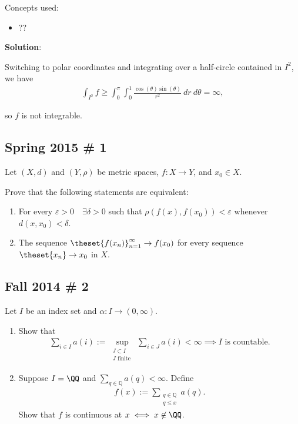 
\begin{solution}

Concepts used:

\begin{itemize}
\tightlist
\item
  ??
\end{itemize}

\textbf{Solution}:

Switching to polar coordinates and integrating over a half-circle
contained in \(I^2\), we have
\begin{align*}
\int_{I^2} f \geq \int_0^\pi \int_0^1 \frac{\cos(\theta)\sin(\theta)}{r^2} ~dr~d\theta = \infty
,\end{align*}

so \(f\) is not integrable.

\end{solution}

\hypertarget{spring-2015-1}{%
\subsection{Spring 2015 \# 1}\label{spring-2015-1}}

Let \((X, d)\) and \((Y, \rho)\) be metric spaces, \(f: X\to Y\), and
\(x_0 \in X\).

Prove that the following statements are equivalent:

\begin{enumerate}
\def\labelenumi{\arabic{enumi}.}
\tightlist
\item
  For every \(\varepsilon > 0 \quad \exists \delta > 0\) such that
  \(\rho( f(x), f(x_0) ) < \varepsilon\) whenever
  \(d(x, x_0) < \delta\).
\item
  The sequence \(\theset{f(x_n)}_{n=1}^\infty \to f(x_0)\) for every
  sequence \(\theset{x_n} \to x_0\) in \(X\).
\end{enumerate}

\hypertarget{fall-2014-2}{%
\subsection{Fall 2014 \# 2}\label{fall-2014-2}}

Let \(I\) be an index set and \(\alpha: I \to (0, \infty)\).

\begin{enumerate}
\def\labelenumi{\arabic{enumi}.}
\item
  Show that
  \begin{align*}
  \sum_{i \in I} a(i):=\sup _{\substack{ J \subset I \\ J \text { finite }}} \sum_{i \in J} a(i)<\infty \implies I \text{ is countable.}
  \end{align*}
\item
  Suppose \(I = \QQ\) and \(\sum_{q \in \mathbb{Q}} a(q)<\infty\).
  Define
  \begin{align*}
    f(x):=\sum_{\substack{q \in \mathbb{Q}\\ q \leq x}} a(q).
    \end{align*} Show that \(f\) is continuous at
  \(x \iff x\not\in \QQ\).
\end{enumerate}


